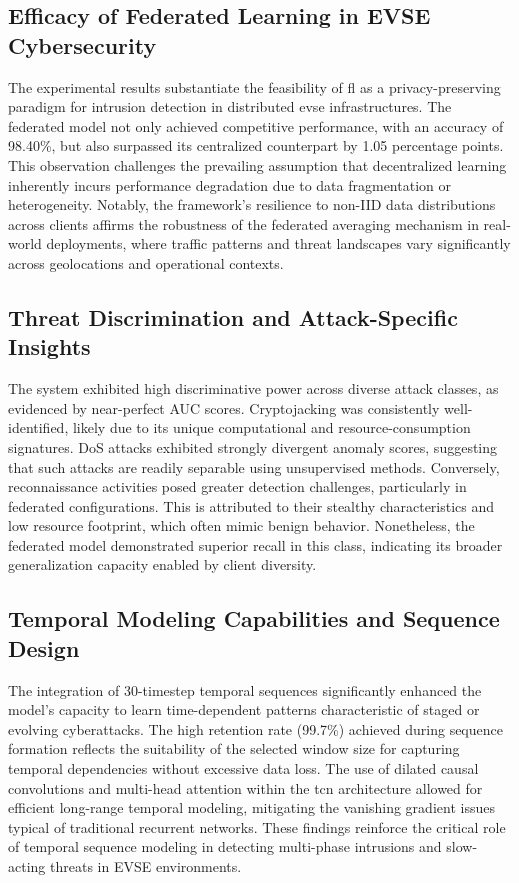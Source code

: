 \subsection{Efficacy of Federated Learning in EVSE Cybersecurity}
The experimental results substantiate the feasibility of \gls{fl} as a privacy-preserving paradigm for intrusion detection in distributed \gls{evse} infrastructures. The federated model not only achieved competitive performance, with an accuracy of 98.40\%, but also surpassed its centralized counterpart by 1.05 percentage points. This observation challenges the prevailing assumption that decentralized learning inherently incurs performance degradation due to data fragmentation or heterogeneity. Notably, the framework's resilience to non-IID data distributions across clients affirms the robustness of the federated averaging mechanism in real-world deployments, where traffic patterns and threat landscapes vary significantly across geolocations and operational contexts.

\subsection{Threat Discrimination and Attack-Specific Insights}
The system exhibited high discriminative power across diverse attack classes, as evidenced by near-perfect AUC scores. Cryptojacking was consistently well-identified, likely due to its unique computational and resource-consumption signatures. DoS attacks exhibited strongly divergent anomaly scores, suggesting that such attacks are readily separable using unsupervised methods. Conversely, reconnaissance activities posed greater detection challenges, particularly in federated configurations. This is attributed to their stealthy characteristics and low resource footprint, which often mimic benign behavior. Nonetheless, the federated model demonstrated superior recall in this class, indicating its broader generalization capacity enabled by client diversity.

\subsection{Temporal Modeling Capabilities and Sequence Design}
The integration of 30-timestep temporal sequences significantly enhanced the model's capacity to learn time-dependent patterns characteristic of staged or evolving cyberattacks. The high retention rate (99.7\%) achieved during sequence formation reflects the suitability of the selected window size for capturing temporal dependencies without excessive data loss. The use of dilated causal convolutions and multi-head attention within the \gls{tcn} architecture allowed for efficient long-range temporal modeling, mitigating the vanishing gradient issues typical of traditional recurrent networks. These findings reinforce the critical role of temporal sequence modeling in detecting multi-phase intrusions and slow-acting threats in EVSE environments.


